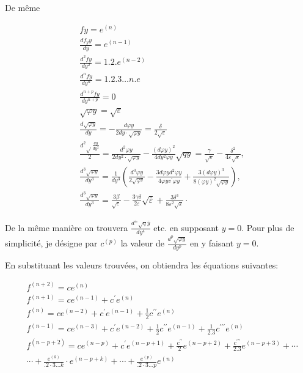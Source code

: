 \documentclass{article}
\begin{document}
De même

\[
\begin{aligned}
& f y=e^{(n)} \\
& \frac{d f_{y} y}{d y}=e^{(n-1)} \\
& \frac{d^{2} f y}{d y^{2}}=1.2 . e^{(n-2)} \\
& \frac{d^{n} f y}{d y^{n}}=1.2 .3 \ldots n . e \\
& \frac{d^{n+p} f y}{d y^{n+p}}=0 \\
& \sqrt{\varphi y}=\sqrt{\varepsilon} \\
& \frac{d \sqrt{\varphi y}}{d y}=-\frac{d \varphi y}{2 d y \cdot \sqrt{\varphi y}}=\frac{\delta}{2 \sqrt{\varepsilon}} \\
& \frac{d^{2} \sqrt{ } \frac{q y}{d y^{2}}}{2}=\frac{d^{2} \varphi y}{2 d y^{2} \cdot \sqrt{\varphi y}}-\frac{(d \varphi y)^{2}}{4 d y^{2} \varphi y} \sqrt{q y}=\frac{\gamma}{\sqrt{\varepsilon}}-\frac{\delta^{2}}{4 \varepsilon \sqrt{\varepsilon}}, \\
& \frac{d^{3} \sqrt{\varphi y}}{d y^{3}}=\frac{1}{d y^{3}}\left(\frac{d^{3} \varphi y}{2 \sqrt{\varphi^{y}}}-\frac{3 d \varphi y d^{2} \varphi y}{4 \varphi y v^{\prime} \varphi y}+\frac{3(d \varphi y)^{3}}{8(\varphi y)^{2} \sqrt{\varphi y}}\right), \\
& \frac{d^{3} \sqrt{\varphi y}}{d y^{3}}=\frac{3 \beta}{\sqrt{\varepsilon}}-\frac{3 \gamma \delta}{2 \varepsilon} \sqrt{\bar{\varepsilon}}+\frac{3 \delta^{3}}{8 \varepsilon^{2} \sqrt{\varepsilon}} \cdot
\end{aligned}
\]

De la même manière on trouvera \(\frac{d^{ \pm} \sqrt{q} \bar{y}}{d y^{4}}\) etc. en supposant \(y=0\). Pour plus de simplicité, je désigne par \(c^{(p)}\) la valeur de \(\frac{d^{p} \sqrt{\varphi y}}{d y^{p}}\) en y faisant \(y=0\).

En substituant les valeurs trouvées, on obtiendra les équations suivantes:

\[
\begin{aligned}
& f^{(n+2)}=c e^{(n)} \\
& f^{(n+1)}=c e^{(n-1)}+c^{\prime} e^{(n)} \\
& f^{(n)}=c e^{(n-2)}+c^{\prime} e^{(n-1)}+\frac{1}{2} c^{\prime \prime} e^{(n)} \\
& f^{(n-1)}=c e^{(n-3)}+c^{\prime} e^{(n-2)}+\frac{1}{2} c^{\prime \prime} e^{(n-1)}+\frac{1}{2.3} c^{\prime \prime \prime} e^{(n)} \\
& f^{(n-p+\dot{2})}=c e^{(n-p)}+c^{\prime} e^{(n-p+1)}+\frac{c^{\prime \prime}}{2} e^{(n-p+2)}+\frac{c^{\prime \prime \prime}}{2.3} e^{(n-p+3)}+\cdots \\
& \cdots+\frac{e^{(k)}}{.2 \cdot 3 \ldots k} \cdot e^{(n-p+k)}+\cdots+\frac{e^{(p)}}{.2 \cdot 3 \ldots p} e^{(n)}
\end{aligned}
\]
\end{document}
